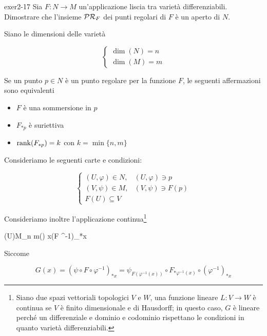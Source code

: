 {exer2-17}
{
Sia $ F : N \to M $ un'applicazione liscia tra varietà differenziabili. Dimostrare che l'insieme $ \mathcal{PR}_{F} $ dei punti regolari di $ F $ è un aperto di $ N $.
}
{

Siano le dimensioni delle varietà

\begin{equation}
	\begin{cases}
		\dim(N) = n \\
		\dim(M) = m
	\end{cases}
\end{equation}

Se un punto $ p \in N $ è un punto regolare per la funzione $ F $, le seguenti affermazioni sono equivalenti

\begin{itemize}
	\item $ F $ è una sommersione in $ p $
	
	\item $ F_{*p} $ è suriettiva
	
	\item  $ \rank(F_{*p}) = k $ con $ k = \min \{n,m\} $
\end{itemize}

Consideriamo le seguenti carte e condizioni:

\begin{equation}
	\begin{cases}
		(U,\varphi) \in N, & (U,\varphi) \ni p \\
		(V,\psi) \in M, & (V,\psi) \ni F(p) \\
		F(U) \subseteq V
	\end{cases}
\end{equation}

Consideriamo inoltre l'applicazione continua\footnote{%
	Siano due spazi vettoriali topologici $ V $ e $ W $, una funzione lineare $ L : V \to W $ è continua se $ V $ è finito dimensionale e di Hausdorff; in questo caso, $ G $ è lineare perché un differenziale e dominio e codominio rispettano le condizioni in quanto varietà differenziabili.%
}

	{\varphi(U)}{M_{n \times m}(\R)}
	{x}{(\psi \circ F \circ \varphi^{-1})_{*x}}

Siccome

\begin{equation}
	G(x) = (\psi \circ F \circ \varphi^{-1})_{*x} %
	= \psi_{F(\varphi^{-1}(x))} \circ F_{*\varphi^{-1}(x)} \circ (\varphi^{-1})_{*x}
\end{equation}

}
